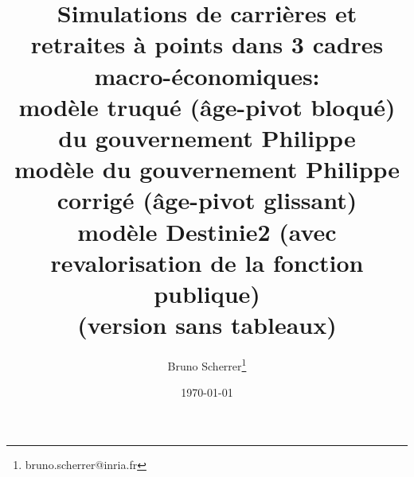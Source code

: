 \documentclass[a4paper,10pt]{report}
\title{Simulations de carrières et retraites à points dans 3 cadres macro-économiques:\\
  modèle truqué (âge-pivot bloqué) du gouvernement Philippe \\
  modèle du gouvernement Philippe corrigé (âge-pivot glissant)\\
  modèle Destinie2 (avec revalorisation de la fonction publique)\\
(version sans tableaux)}
\author{Bruno Scherrer\footnote{bruno.scherrer@inria.fr}}
\date{\today}
\begin{document}
\makeatletter
\renewcommand\tableofcontents{%
    \@starttoc{toc}%
}
\makeatother

\dominitoc


\maketitle

\doclicenseThis








\end{document}
